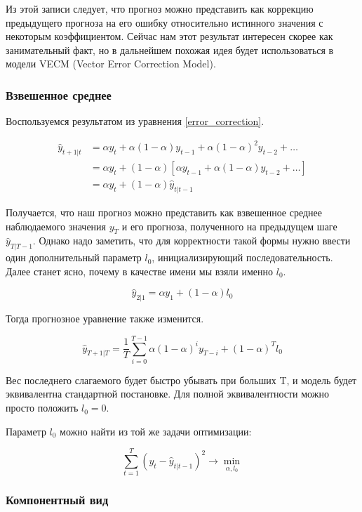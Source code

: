 \documentclass[12pt,fleqn]{article}
\begin{document}
Из этой записи следует, что прогноз можно представить как коррекцию предыдущего прогноза на его ошибку относительно истинного значения с некоторым коэффициентом. Сейчас нам этот результат интересен скорее как занимательный факт, но в дальнейшем похожая идея будет использоваться в модели VECM (Vector Error Correction Model).


\subsubsection{Взвешенное среднее}

Воспользуемся результатом из уравнения \ref{error_correction}.

\begin{equation}
\begin{split}
	\hat{y}_{t+1|t} 
	&= \alpha y_t + \alpha (1-\alpha) y_{t-1} + \alpha (1-\alpha)^2 y_{t-2} + \ldots \\
	&= \alpha y_t +(1-\alpha)[ \alpha y_{t-1} + \alpha (1-\alpha) y_{t-2} + \ldots ] \\
	&=  \alpha y_t +(1-\alpha) \hat{y}_{t|t-1}
\end{split}
\end{equation}

Получается, что наш прогноз можно представить как взвешенное среднее наблюдаемого значения $y_T$ и его прогноза, полученного на предыдущем шаге $\hat{y}_{T|T-1}$. Однако надо заметить, что для корректности такой формы нужно ввести один дополнительный параметр $l_0$, инициализирующий последовательность. Далее станет ясно, почему в качестве имени мы взяли именно $l_0$.

$$
 \hat{y}_{2|1} = \alpha y_1 +(1-\alpha) l_0
$$

Тогда прогнозное уравнение также изменится.

$$
\hat{y}_{T+1|T} = \frac{1}{T}\sum_{i=0}^{T-1} \alpha (1-\alpha)^{i} y_{T-i} + (1-\alpha)^T l_0
$$

Вес последнего слагаемого будет быстро убывать при больших T, и модель будет эквивалентна стандартной постановке. Для полной эквивалентности можно просто положить $l_0 = 0$.

Параметр $l_0$ можно найти из той же задачи оптимизации:

$$
\sum_{t=1}^{T}(y_t - \hat{y}_{t|t-1})^2 \rightarrow \min_{\alpha, l_0}
$$


\subsubsection{Компонентный вид}
\end{document}
